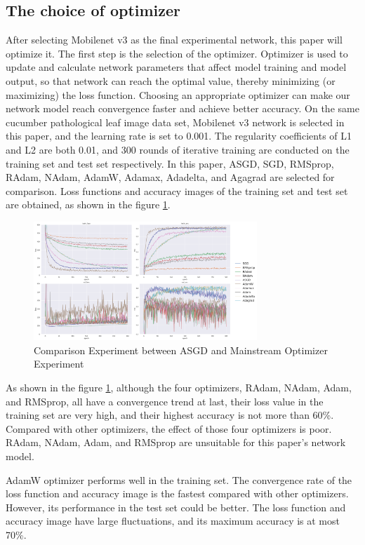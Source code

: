 \documentclass[a4paper,fleqn]{cas-sc}
\begin{document}
\subsection{The choice of optimizer}
After selecting Mobilenet v3 as the final experimental network, this paper will optimize it. The first step is the selection of the optimizer. Optimizer is used to update and calculate network parameters that affect model training and model output, so that network can reach the optimal value, thereby minimizing (or maximizing) the loss function. Choosing an appropriate optimizer can make our network model reach convergence faster and achieve better accuracy. On the same cucumber pathological leaf image data set, Mobilenet v3 network is selected in this paper, and the learning rate is set to 0.001. The regularity coefficients of L1 and L2 are both 0.01, and 300 rounds of iterative training are conducted on the training set and test set respectively. In this paper, ASGD, SGD, RMSprop, RAdam, NAdam, AdamW, Adamax, Adadelta, and Agagrad are selected for comparison. Loss functions and accuracy images of the training set and test set are obtained, as shown in the figure \ref{fig:f5}.
\begin{figure}
\centering
\includegraphics[width=0.75\textwidth]{figs_rev1/f5.png}
\caption{Comparison Experiment between ASGD and Mainstream Optimizer Experiment}
\label{fig:f5}
\end{figure}

As shown in the figure \ref{fig:f5}, although the four optimizers, RAdam, NAdam, Adam, and RMSprop, all have a convergence trend at last, their loss value in the training set are very high, and their highest accuracy is not more than 60\%. Compared with other optimizers, the effect of those four optimizers is poor. RAdam, NAdam, Adam, and RMSprop are unsuitable for this paper's network model. 

AdamW optimizer performs well in the training set. The convergence rate of the loss function and accuracy image is the fastest compared with other optimizers. However, its performance in the test set could be better. The loss function and accuracy image have large fluctuations, and its maximum accuracy is at most 70\%. 
\end{document}
